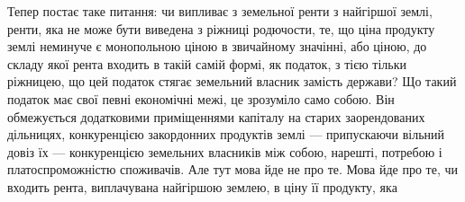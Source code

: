 Тепер постає таке питання: чи випливає з земельної ренти з найгіршої
землі, ренти, яка не може бути виведена з ріжниці родючости, те, що ціна
продукту землі неминуче є монопольною ціною в звичайному значінні, або
ціною, до складу якої рента входить в такій самій формі, як податок, з тією
тільки ріжницею, що цей податок стягає земельний власник замість держави?
Що такий податок має свої певні економічні межі, це зрозуміло само собою.
Він обмежується додатковими приміщеннями капіталу на старих заорендованих
дільницях, конкуренцією закордонних продуктів землі — припускаючи вільний
довіз їх — конкуренцією земельних власників між собою, нарешті, потребою
і платоспроможністю споживачів. Але тут мова йде не про те. Мова йде про
те, чи входить рента, виплачувана найгіршою землею, в ціну її продукту, яка
\parbreak{}  %
